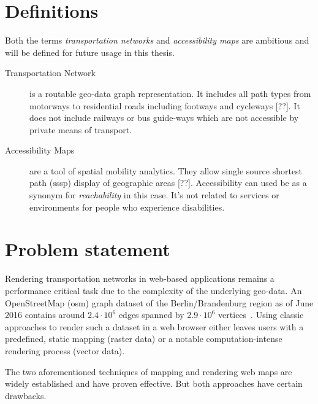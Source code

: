   \section{Definitions}
    \label{sec:intro:def}
    Both the terms \textit{transportation networks} and \textit{accessibility
    maps} are ambitious and will be defined for future usage in this
    thesis.\par

    \begin{description}
      \item[Transportation Network] is a routable geo-data graph representation.
        It includes all path types from motorways to residential roads
        including footways and cycleways [??]. It does not include railways or bus
        guide-ways which are not accessible by private means of transport.
      \item[Accessibility Maps] are a tool of spatial mobility analytics. They
        allow single source shortest path (\acrshort{sssp}) display of
        geographic areas [??]. Accessibility can used be as a synonym for
        \textit{reachability} in this case. It's not related to services or
        environments for people who experience disabilities.
    \end{description}

  \section{Problem statement}
    \label{sec:intro:probl}


    Rendering transportation networks in web-based applications remains a
    performance critical task due to the complexity of the underlying geo-data.
    An OpenStreetMap (\acrshort{osm}) graph dataset of the Berlin/Brandenburg
    region as
    of June 2016 contains around $2.4 \cdot 10^6$ edges spanned by
    $2.9 \cdot 10^6$ vertices~\cite{STHD2016}. Using
    classic approaches to render such a dataset in a web browser either
    leaves users with a predefined, static mapping (raster data) or a notable
    computation-intense rendering process (vector data).\par

    The two aforementioned techniques of mapping and rendering web maps are
    widely established and have proven effective. But both approaches have
    certain drawbacks.\par

